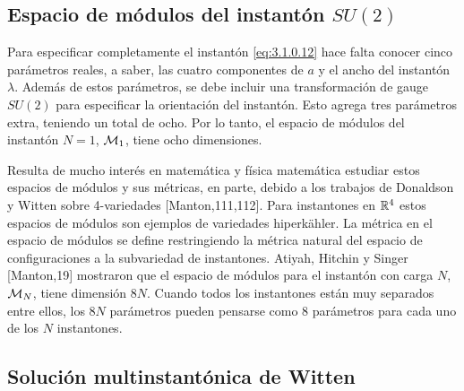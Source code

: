\subsection{Espacio de módulos del instantón $SU(2)$}

Para especificar completamente el instantón \eqref{eq:3.1.0.12} hace falta conocer cinco parámetros reales, a saber, las cuatro componentes de $a$ y el ancho del instantón $\lambda$. Además de estos parámetros, se debe incluir una transformación de gauge $SU(2)$ para especificar la orientación del instantón. Esto agrega tres parámetros extra, teniendo un total de ocho. Por lo tanto, el espacio de módulos del instantón $N=1$, $\mathcal{M}_1$, tiene ocho dimensiones.

Resulta de mucho interés en matemática y física matemática estudiar estos espacios de módulos y sus métricas, en parte, debido a los trabajos de Donaldson y Witten sobre 4-variedades [Manton,111,112].  Para instantones en $\mathbb{R}^4$ estos espacios de módulos son ejemplos de variedades hiperkähler. La métrica en el espacio de módulos se define restringiendo la métrica natural del espacio de configuraciones a la subvariedad de instantones. Atiyah, Hitchin y Singer [Manton,19] mostraron que el espacio de módulos para el instantón con carga $N$, $\mathcal{M}_N$, tiene dimensión $8N$. Cuando todos los instantones están muy separados entre ellos, los $8N$ parámetros pueden pensarse como $8$ parámetros para cada uno de los $N$ instantones.

\subsection{Solución multinstantónica de Witten}

